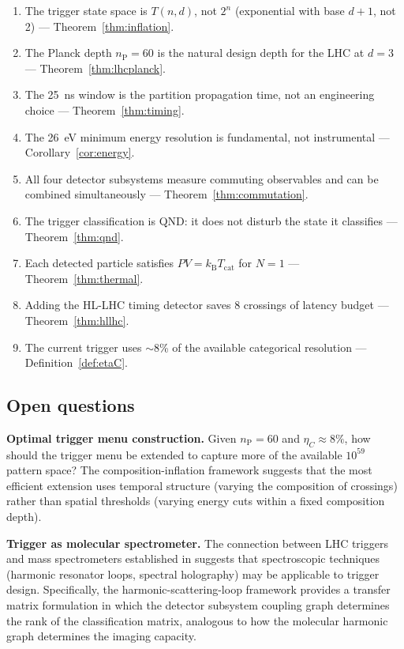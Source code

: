 \documentclass[twocolumn,10pt,a4paper]{article}
\theoremstyle{thmstyle}
\theoremstyle{definition}
\theoremstyle{remark}
\newcommand{\nP}{n_{\mathrm{P}}}
\newcommand{\kB}{k_{\mathrm{B}}}
\newcommand{\etaC}{\eta_{C}}
\begin{document}
\begin{enumerate}[nosep,label=(\arabic*)]
\item The trigger state space is $T(n,d)$, not $2^n$ (exponential with
base $d+1$, not 2) — Theorem~\ref{thm:inflation}.
\item The Planck depth $\nP = 60$ is the natural design depth for the LHC
at $d = 3$ — Theorem~\ref{thm:lhcplanck}.
\item The 25~ns window is the partition propagation time, not an
engineering choice — Theorem~\ref{thm:timing}.
\item The 26~eV minimum energy resolution is fundamental, not instrumental
— Corollary~\ref{cor:energy}.
\item All four detector subsystems measure commuting observables and can
be combined simultaneously — Theorem~\ref{thm:commutation}.
\item The trigger classification is QND: it does not disturb the state
it classifies — Theorem~\ref{thm:qnd}.
\item Each detected particle satisfies $PV = \kB T_{\mathrm{cat}}$ for $N = 1$
— Theorem~\ref{thm:thermal}.
\item Adding the HL-LHC timing detector saves 8 crossings of latency
budget — Theorem~\ref{thm:hllhc}.
\item The current trigger uses $\sim 8$\% of the available categorical
resolution — Definition~\ref{def:etaC}.
\end{enumerate}

\subsection{Open questions}

\textbf{Optimal trigger menu construction.} Given $\nP = 60$ and
$\etaC \approx 8\%$, how should the trigger menu be extended to capture
more of the available $10^{59}$ pattern space? The composition-inflation
framework suggests that the most efficient extension uses temporal
structure (varying the composition of crossings) rather than spatial
thresholds (varying energy cuts within a fixed composition depth).

\textbf{Trigger as molecular spectrometer.} The connection between LHC
triggers and mass spectrometers established in \citet{companion:ion}
suggests that spectroscopic techniques (harmonic resonator loops, spectral
holography) may be applicable to trigger design. Specifically, the
harmonic-scattering-loop framework \citep{companion:hsl} provides a
transfer matrix formulation in which the detector subsystem coupling graph
determines the rank of the classification matrix, analogous to how the
molecular harmonic graph determines the imaging capacity.
\end{document}
